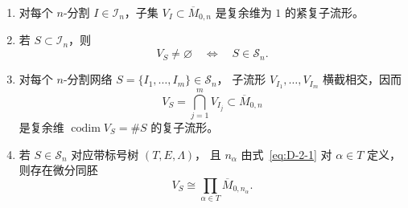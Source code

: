 \begin{theorem}[Knudsen]\label{thm:D-4-7}
\begin{enumerate}
\item[(i)] 对每个 $n$-分割 $I\in\mathcal I_n$，子集
$V_I\subset\overline M_{0,n}$ 是复余维为 $1$ 的紧复子流形。
\item[(ii)] 若 $S\subset\mathcal I_n$，则
\[
  V_S\ne\varnothing\quad\Longleftrightarrow\quad S\in\mathcal S_n.
\]
\item[(iii)] 对每个 $n$-分割网络
$S=\{I_1,\ldots,I_m\}\in\mathcal S_n$，
子流形 $V_{I_1},\ldots,V_{I_m}$ 横截相交，因而
\[
  V_S=\bigcap_{j=1}^m V_{I_j}\subset\overline M_{0,n}
\]
是复余维 $\operatorname{codim}V_S=\#S$ 的复子流形。
\item[(iv)] 若 $S\in\mathcal S_n$ 对应带标号树 $(T,E,\Lambda)$，
且 $n_\alpha$ 由式~\eqref{eq:D-2-1} 对 $\alpha\in T$ 定义，
则存在微分同胚
\[
  V_S\cong\prod_{\alpha\in T}\overline M_{0,n_\alpha}.
\]
\end{enumerate}
\end{theorem}

